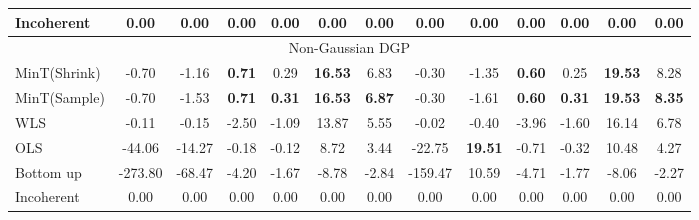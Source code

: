\documentclass[12pt]{article}
\theoremstyle{definition}
\begin{document}
\begin{table}[H]
{\begin{tabular}{lcccccccccccc}
			Incoherent & 0.00 & 0.00 & 0.00 & 0.00 & 0.00 & 0.00 & 0.00 & 0.00 & 0.00 & 0.00 & 0.00 & 0.00\\
			
			\toprule
			\multicolumn{13}{c}{Non-Gaussian DGP}\\
			\toprule
			
			MinT(Shrink) & -0.70 & -1.16 & \textbf{0.71} & 0.29 & \textbf{16.53} & 6.83 & -0.30 & -1.35 & \textbf{0.60} & 0.25 & \textbf{19.53} & 8.28\\
			
			MinT(Sample) & -0.70 & -1.53 & \textbf{0.71} & \textbf{0.31} & \textbf{16.53} & \textbf{6.87} & -0.30 & -1.61 & \textbf{0.60} & \textbf{0.31} & \textbf{19.53} & \textbf{8.35}\\
			
			WLS & -0.11 & -0.15 & -2.50 & -1.09 & 13.87 & 5.55 & -0.02 & -0.40 & -3.96 & -1.60 & 16.14 & 6.78\\
			
			OLS & -44.06 & -14.27 & -0.18 & -0.12 & 8.72 & 3.44 & -22.75 & \textbf{19.51} & -0.71 & -0.32 & 10.48 & 4.27\\
			
			Bottom up & -273.80 & -68.47 & -4.20 & -1.67 & -8.78 & -2.84 & -159.47 & 10.59 & -4.71 & -1.77 & -8.06 & -2.27\\
			
			Incoherent & 0.00 & 0.00 & 0.00 & 0.00 & 0.00 & 0.00 & 0.00 & 0.00 & 0.00 & 0.00 & 0.00 & 0.00\\
			\bottomrule
		\end{tabular}
	}
\end{table}
\end{document}
